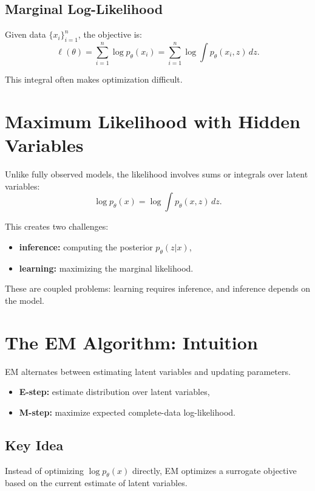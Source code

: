 \subsection{Marginal Log-Likelihood}

Given data $\{x_i\}_{i=1}^n$, the objective is:
\[
\ell(\theta) = \sum_{i=1}^n \log p_\theta(x_i)
= \sum_{i=1}^n \log \int p_\theta(x_i, z)\,dz.
\]

This integral often makes optimization difficult.

\section{Maximum Likelihood with Hidden Variables}

Unlike fully observed models, the likelihood involves sums or integrals over latent variables:
\[
\log p_\theta(x) = \log \int p_\theta(x,z)\,dz.
\]

This creates two challenges:
\begin{itemize}
    \item \textbf{inference:} computing the posterior $p_\theta(z|x)$,
    \item \textbf{learning:} maximizing the marginal likelihood.
\end{itemize}

These are coupled problems: learning requires inference, and inference depends on the model.

\section{The EM Algorithm: Intuition}

EM alternates between estimating latent variables and updating parameters.

\begin{itemize}
    \item \textbf{E-step:} estimate distribution over latent variables,
    \item \textbf{M-step:} maximize expected complete-data log-likelihood.
\end{itemize}

\subsection{Key Idea}

Instead of optimizing $\log p_\theta(x)$ directly, EM optimizes a surrogate objective based on the current estimate of latent variables.

